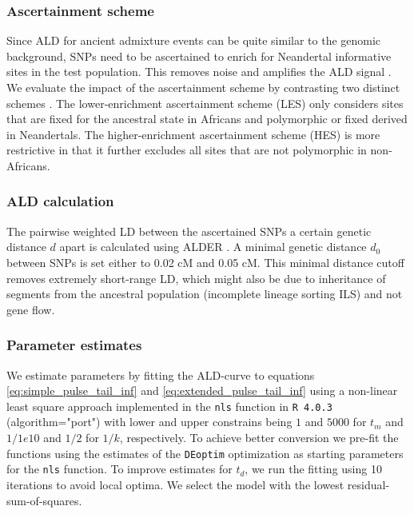 \documentclass[11pt]{article}
\begin{document}
\subsubsection{Ascertainment scheme}\label{asceteinment scheme}
Since ALD for ancient admixture events can be quite similar to the genomic background, SNPs need to be ascertained to enrich for
Neandertal informative sites in the test population. This removes noise and
amplifies the ALD signal \citep{sankararaman_date_2012}. 
We evaluate the impact of the ascertainment scheme by contrasting two distinct schemes \citep{sankararaman_date_2012,fu_genome_2014}. The lower-enrichment ascertainment scheme (LES) only considers  sites that are fixed for the ancestral state in
Africans and polymorphic or fixed derived in Neandertals. The higher-enrichment
ascertainment scheme (HES) is more restrictive in that it further excludes all sites that are not polymorphic in non-Africans.

\subsubsection{ALD calculation}\label{ALD calculation}

The pairwise weighted LD between the ascertained SNPs a certain genetic
distance \(d\) apart is calculated using ALDER
\citep{loh_inferring_2013}.  A minimal genetic distance \(d_0\) between
SNPs is set either to 0.02 cM and 0.05 cM. This minimal distance cutoff
removes extremely short-range LD, which might also be due to inheritance of segments from the ancestral population (incomplete lineage sorting ILS) and not gene flow. 

\subsubsection{Parameter estimates}\label{Parameter estimate}

We estimate parameters by fitting the ALD-curve to equations \ref{eq:simple_pulse_tail_inf} and \ref{eq:extended_pulse_tail_inf}  using a non-linear least square approach implemented in the  \texttt{nls} function in \texttt{R 4.0.3} (algorithm="port") with lower and upper constrains being $1$ and $5000$ for $t_m$ and $1/1e10$ and $1/2$ for $1/k$, respectively. To achieve better conversion we pre-fit the functions using the estimates of the \texttt{DEoptim} optimization  \citep{ardia_deoptim_2016} as starting parameters for the \texttt{nls} function. To improve estimates for $t_d$, we run the fitting using 10 iterations to avoid local optima. We select the model with the lowest residual-sum-of-squares. 
\end{document}
